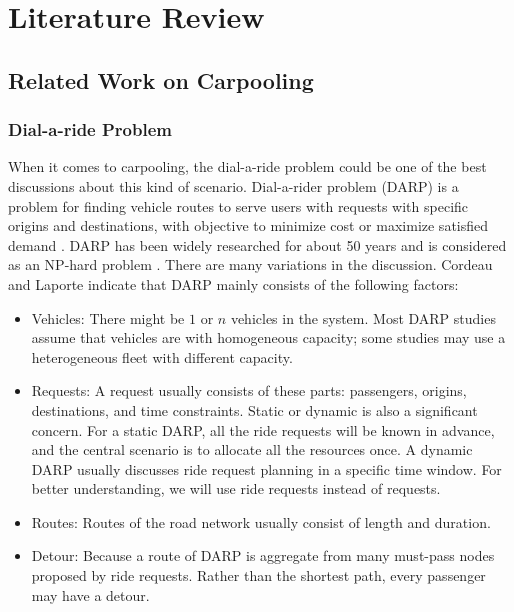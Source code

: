 
\chapter{Literature Review}

\section{Related Work on Carpooling}



\subsection{Dial-a-ride Problem}

When it comes to carpooling, the dial-a-ride problem could be one of the best discussions about this kind of scenario. Dial-a-rider problem (DARP) is a problem for finding vehicle routes to serve users with requests with specific origins and destinations, with objective to minimize cost or maximize satisfied demand \cite{cordeau_dial--ride_2007}. DARP has been widely researched for about 50 years \cite{wilson1971scheduling} and is considered as an NP-hard problem \cite{cordeau_branch-and-cut_2006}. There are many variations in the discussion. Cordeau and Laporte \cite{cordeau_dial--ride_2007} indicate that DARP mainly consists of the following factors:

\begin{itemize}
  \item Vehicles: There might be $1$ or $n$ vehicles in the system. Most DARP studies assume that vehicles are with homogeneous capacity; some studies may use a heterogeneous fleet with different capacity.
  \item Requests: A request usually consists of these parts: passengers, origins, destinations, and time constraints. Static or dynamic is also a significant concern. For a static DARP, all the ride requests will be known in advance, and the central scenario is to allocate all the resources once. A dynamic DARP usually discusses ride request planning in a specific time window. For better understanding, we will use ride requests instead of requests.
  \item Routes: Routes of the road network usually consist of length and duration.
  \item Detour: Because a route of DARP is aggregate from many must-pass nodes proposed by ride requests. Rather than the shortest path, every passenger may have a detour.
\end{itemize}

